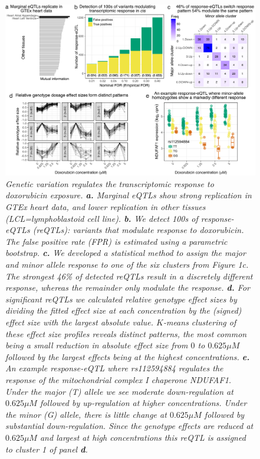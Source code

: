 \documentclass{article}
\begin{document}
\begin{figure}
\begin{center}
    \includegraphics[width=1\textwidth]{../figures/fig2.pdf}     \caption{\it{Genetic variation regulates the transcriptomic response to doxorubicin exposure. \textbf{a.} Marginal eQTLs show strong replication in GTEx heart data, and lower replication in other tissues (LCL=lymphoblastoid cell line). \textbf{b.} We detect 100s of response-eQTLs (reQTLs): variants that modulate response to doxorubicin. The false positive rate (FPR) is estimated using a parametric bootstrap. \textbf{c.} We developed a statistical method to assign the major and minor allele response to one of the six clusters from Figure 1c. The strongest 46\% of detected reQTLs result in a discretely different response, whereas the remainder only modulate the response. \textbf{d.} For significant reQTLs we calculated relative genotype effect sizes by dividing the fitted effect size at each concentration by the (signed) effect size with the largest absolute value. $K$-means clustering of these effect size profiles reveals distinct patterns, the most common being a small reduction in absolute effect size from $0$ to $0.625\mu M$ followed by the largest effects being at the highest concentrations. \textbf{e.} An example response-eQTL where rs112594884 regulates the response of the mitochondrial complex I chaperone NDUFAF1. Under the major (T) allele we see moderate down-regulation at $0.625\mu M$ followed by up-regulation at higher concentrations. Under the minor (G) allele, there is little change at $0.625\mu M$ followed by substantial down-regulation. Since the genotype effects are reduced at $0.625\mu M$ and largest at high concentrations this reQTL is assigned to cluster 1 of panel \textbf{d}.}}
    \label{fig2}
    \end{center}
\end{figure}
\end{document}
